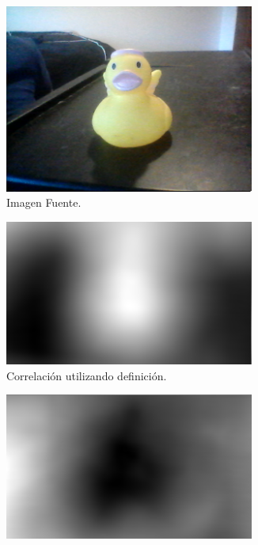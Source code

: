 \begin{figure}[H]
\centering
	\begin{subfigure}{.4\textwidth}
		\centering
		\includegraphics[width=0.9\textwidth]{Imagenes/Original.png}
		\caption{Imagen Fuente.}
		\label{fig:original}
	\end{subfigure}
	\begin{subfigure}{.4\textwidth}
		\centering
		\includegraphics[width=0.9\textwidth]{Imagenes/Correlation.png}
		\caption{Correlación utilizando definición.}
		\label{fig:corr}
	\end{subfigure}
		\begin{subfigure}{.4\textwidth}
		\centering
		\includegraphics[width=0.9\textwidth]{Imagenes/SQDIFF.png}

\end{subfigure}
\end{figure}
